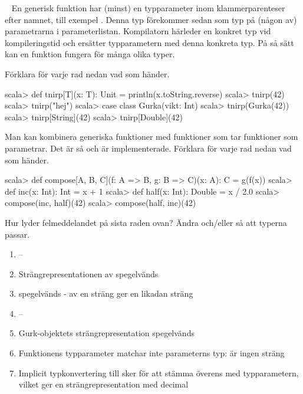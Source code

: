 \QUESTEND






\clearpage

\AdvancedTasks %



\QUESTBEGIN

\Task  \what~  En generisk funktion har (minst) en typparameter inom klammerparenteser efter namnet, till exempel \code{[T]}. Denna typ förekommer sedan som typ på (någon av) parametrarna i parameterlistan. Kompilatorn härleder en konkret typ vid kompileringstid och ersätter typparametern med denna konkreta typ. På så sätt kan en funktion fungera för många olika typer.

\Subtask Förklara för varje rad nedan vad som händer.

\begin{REPL}
scala> def tnirp[T](x: T): Unit = println(x.toString.reverse)
scala> tnirp(42)
scala> tnirp("hej")
scala> case class Gurka(vikt: Int)
scala> tnirp(Gurka(42))
scala> tnirp[String](42)
scala> tnirp[Double](42)
\end{REPL}

\Subtask Man kan kombinera generiska funktioner med funktioner som tar funktioner som parametrar. Det är så  och  är implementerade. Förklara för varje rad nedan vad som händer.

\begin{REPL}
scala> def compose[A, B, C](f: A => B, g: B => C)(x: A): C = g(f(x))
scala> def inc(x: Int): Int = x + 1
scala> def half(x: Int): Double = x / 2.0
scala> compose(inc, half)(42)
scala> compose(half, inc)(42)
\end{REPL}

\Subtask Hur lyder felmeddelandet på sista raden ovan? Ändra  och/eller  så att typerna passar.

\SOLUTION

\TaskSolved \what

\SubtaskSolved   \begin{enumerate}
\item --
\item Strängrepresentationen av  spegelvänds
\item {} spegelvänds -  av en sträng ger en likadan sträng
\item --
\item Gurk-objektets strängrepresentation spegelvänds
\item Funktionens typparameter matchar inte parameterns typ:  är ingen sträng
\item Implicit typkonvertering till  sker för att stämma överens med typparametern, vilket ger en strängrepresentation med decimal
\end{enumerate}

